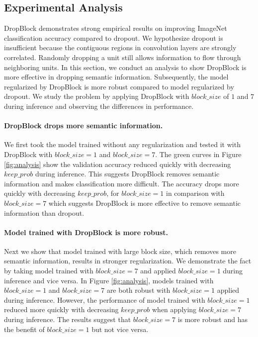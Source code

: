 \documentclass{article}
\begin{document}
\subsection{Experimental Analysis}
DropBlock demonstrates strong empirical results on improving ImageNet classification accuracy compared to dropout. We hypothesize dropout is insufficient because the contiguous regions in convolution layers are strongly correlated. Randomly dropping a unit still allows information to flow through neighboring units. In this section, we conduct an analysis to show DropBlock is more effective in dropping semantic information. Subsequently, the model regularized by DropBlock is more robust compared to model regularized by dropout. We study the problem by applying DropBlock with $block\_size$ of $1$ and $7$ during inference and observing the differences in performance.

\paragraph{DropBlock drops more semantic information.}
We first took the model trained without any regularization and tested it with DropBlock with $block\_size=1$ and $block\_size=7$. The green curves in Figure \ref{fig:analysis} show the validation accuracy reduced quickly with decreasing $keep\_prob$ during inference. This suggests DropBlock removes semantic information and makes classification more difficult.
The accuracy drops more quickly with decreasing $keep\_prob$, for $block\_size=1$ in comparison with $block\_size=7$ which suggests DropBlock is more effective to remove semantic information than dropout.

\paragraph{Model trained with DropBlock is more robust.}
Next we show that model trained with large block size, which removes more semantic information, results in stronger regularization. We demonstrate the fact by taking model trained with $block\_size=7$ and applied $block\_size=1$ during inference and vice versa. In Figure \ref{fig:analysis}, models trained with $block\_size=1$ and $block\_size=7$ are both robust with $block\_size=1$ applied during inference. However, the performance of model trained with $block\_size=1$ reduced more quickly with decreasing $keep\_prob$ when applying $block\_size=7$ during inference. The results suggest that $block\_size=7$ is more robust and has the benefit of $block\_size=1$ but not vice versa.
\end{document}
